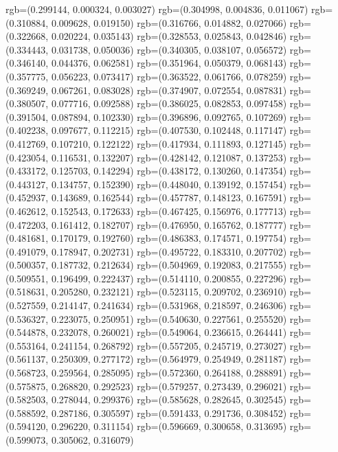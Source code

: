 {{{					rgb=(0.299144, 0.000324, 0.003027)
					rgb=(0.304998, 0.004836, 0.011067)
					rgb=(0.310884, 0.009628, 0.019150)
					rgb=(0.316766, 0.014882, 0.027066)
					rgb=(0.322668, 0.020224, 0.035143)
					rgb=(0.328553, 0.025843, 0.042846)
					rgb=(0.334443, 0.031738, 0.050036)
					rgb=(0.340305, 0.038107, 0.056572)
					rgb=(0.346140, 0.044376, 0.062581)
					rgb=(0.351964, 0.050379, 0.068143)
					rgb=(0.357775, 0.056223, 0.073417)
					rgb=(0.363522, 0.061766, 0.078259)
					rgb=(0.369249, 0.067261, 0.083028)
					rgb=(0.374907, 0.072554, 0.087831)
					rgb=(0.380507, 0.077716, 0.092588)
					rgb=(0.386025, 0.082853, 0.097458)
					rgb=(0.391504, 0.087894, 0.102330)
					rgb=(0.396896, 0.092765, 0.107269)
					rgb=(0.402238, 0.097677, 0.112215)
					rgb=(0.407530, 0.102448, 0.117147)
					rgb=(0.412769, 0.107210, 0.122122)
					rgb=(0.417934, 0.111893, 0.127145)
					rgb=(0.423054, 0.116531, 0.132207)
					rgb=(0.428142, 0.121087, 0.137253)
					rgb=(0.433172, 0.125703, 0.142294)
					rgb=(0.438172, 0.130260, 0.147354)
					rgb=(0.443127, 0.134757, 0.152390)
					rgb=(0.448040, 0.139192, 0.157454)
					rgb=(0.452937, 0.143689, 0.162544)
					rgb=(0.457787, 0.148123, 0.167591)
					rgb=(0.462612, 0.152543, 0.172633)
					rgb=(0.467425, 0.156976, 0.177713)
					rgb=(0.472203, 0.161412, 0.182707)
					rgb=(0.476950, 0.165762, 0.187777)
					rgb=(0.481681, 0.170179, 0.192760)
					rgb=(0.486383, 0.174571, 0.197754)
					rgb=(0.491079, 0.178947, 0.202731)
					rgb=(0.495722, 0.183310, 0.207702)
					rgb=(0.500357, 0.187732, 0.212634)
					rgb=(0.504969, 0.192083, 0.217555)
					rgb=(0.509551, 0.196499, 0.222437)
					rgb=(0.514110, 0.200855, 0.227296)
					rgb=(0.518631, 0.205280, 0.232121)
					rgb=(0.523115, 0.209702, 0.236910)
					rgb=(0.527559, 0.214147, 0.241634)
					rgb=(0.531968, 0.218597, 0.246306)
					rgb=(0.536327, 0.223075, 0.250951)
					rgb=(0.540630, 0.227561, 0.255520)
					rgb=(0.544878, 0.232078, 0.260021)
					rgb=(0.549064, 0.236615, 0.264441)
					rgb=(0.553164, 0.241154, 0.268792)
					rgb=(0.557205, 0.245719, 0.273027)
					rgb=(0.561137, 0.250309, 0.277172)
					rgb=(0.564979, 0.254949, 0.281187)
					rgb=(0.568723, 0.259564, 0.285095)
					rgb=(0.572360, 0.264188, 0.288891)
					rgb=(0.575875, 0.268820, 0.292523)
					rgb=(0.579257, 0.273439, 0.296021)
					rgb=(0.582503, 0.278044, 0.299376)
					rgb=(0.585628, 0.282645, 0.302545)
					rgb=(0.588592, 0.287186, 0.305597)
					rgb=(0.591433, 0.291736, 0.308452)
					rgb=(0.594120, 0.296220, 0.311154)
					rgb=(0.596669, 0.300658, 0.313695)
					rgb=(0.599073, 0.305062, 0.316079)
}}}
